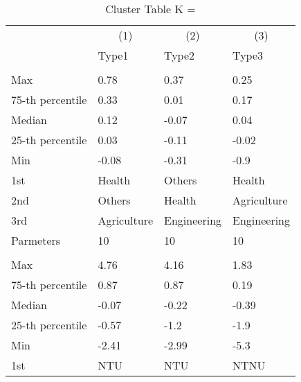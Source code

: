 \begin{table}
\centering
\caption{Cluster Table K = }
\centering
\begin{threeparttable}
\begin{tabular}[t]{llll}
\toprule
\multicolumn{1}{c}{ } & \multicolumn{1}{c}{(1)} & \multicolumn{1}{c}{(2)} & \multicolumn{1}{c}{(3)} \\
\cmidrule(l{3pt}r{3pt}){2-2} \cmidrule(l{3pt}r{3pt}){3-3} \cmidrule(l{3pt}r{3pt}){4-4}
 & Type1 & Type2 & Type3\\
\midrule
\addlinespace[0.3em]
\multicolumn{4}{l}{\textit{\textbf{Panel A: }}}\\
\hspace{1em}Max & 0.78 & 0.37 & 0.25\\
\hspace{1em}75-th percentile & 0.33 & 0.01 & 0.17\\
\hspace{1em}Median & 0.12 & -0.07 & 0.04\\
\hspace{1em}25-th percentile & 0.03 & -0.11 & -0.02\\
\hspace{1em}Min & -0.08 & -0.31 & -0.9\\
\hspace{1em}1st & Health & Others & Health\\
\hspace{1em}2nd & Others & Health & Agriculture\\
\hspace{1em}3rd & Agriculture & Engineering & Engineering\\
\hspace{1em}Parmeters & 10 & 10 & 10\\
\addlinespace[0.3em]
\multicolumn{4}{l}{\textit{\textbf{Panel B: }}}\\
\hspace{1em}Max & 4.76 & 4.16 & 1.83\\
\hspace{1em}75-th percentile & 0.87 & 0.87 & 0.19\\
\hspace{1em}Median & -0.07 & -0.22 & -0.39\\
\hspace{1em}25-th percentile & -0.57 & -1.2 & -1.9\\
\hspace{1em}Min & -2.41 & -2.99 & -5.3\\
\hspace{1em}1st & NTU & NTU & NTNU\\

\end{tabular}
\end{threeparttable}
\end{table}
